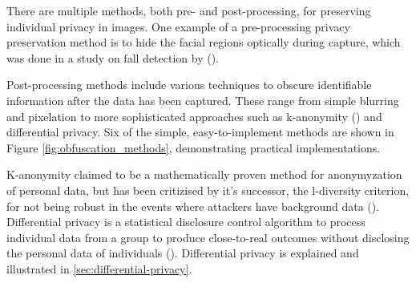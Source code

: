 There are multiple methods, both pre- and post-processing, for preserving individual privacy in images. One example of a pre-processing privacy preservation method is to hide the facial regions optically during capture, which was done in a study on fall detection by \citeauthor{wa2020elderly_fall_detection_meta} (\citeauthor{wa2020elderly_fall_detection_meta}).

Post-processing methods include various techniques to obscure identifiable information after the data has been captured. These range from simple blurring and pixelation to more sophisticated approaches such as k-anonymity (\cite{sw2002kAnonymity}) and differential privacy. Six of the simple, easy-to-implement methods are shown in Figure \ref{fig:obfuscation_methods}, demonstrating practical implementations.

K-anonymity claimed to be a mathematically proven method for anonymyzation of personal data, but has been critizised by it's successor, the l-diversity criterion, for not being robust in the events where attackers have background data (\cite{ma2007l-diversity}). Differential privacy is a statistical disclosure control algorithm to process individual data from a group to produce close-to-real outcomes without disclosing the personal data of individuals (\cite{hu2023metaverse-privacy}). Differential privacy is explained and illustrated in \ref{sec:differential-privacy}.


